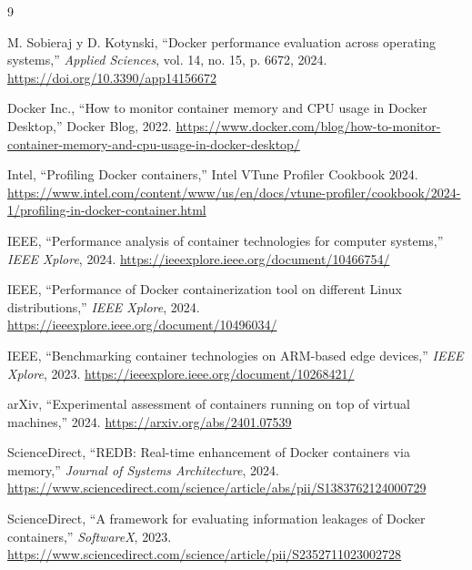 \documentclass[conference]{IEEEtran}
\begin{document}
\begin{thebibliography}{9}

M. Sobieraj y D. Kotynski,
``Docker performance evaluation across operating systems,''
\emph{Applied Sciences}, vol. 14, no. 15, p. 6672, 2024.
\url{https://doi.org/10.3390/app14156672}

Docker Inc.,
``How to monitor container memory and CPU usage in Docker Desktop,''
Docker Blog, 2022.
\url{https://www.docker.com/blog/how-to-monitor-container-memory-and-cpu-usage-in-docker-desktop/}

Intel,
``Profiling Docker containers,''
Intel VTune Profiler Cookbook 2024.
\url{https://www.intel.com/content/www/us/en/docs/vtune-profiler/cookbook/2024-1/profiling-in-docker-container.html}

IEEE,
``Performance analysis of container technologies for computer systems,''
\emph{IEEE Xplore}, 2024.
\url{https://ieeexplore.ieee.org/document/10466754/}

IEEE,
``Performance of Docker containerization tool on different Linux distributions,''
\emph{IEEE Xplore}, 2024.
\url{https://ieeexplore.ieee.org/document/10496034/}

IEEE,
``Benchmarking container technologies on ARM-based edge devices,''
\emph{IEEE Xplore}, 2023.
\url{https://ieeexplore.ieee.org/document/10268421/}

arXiv,
``Experimental assessment of containers running on top of virtual machines,''
2024.
\url{https://arxiv.org/abs/2401.07539}

ScienceDirect,
``REDB: Real-time enhancement of Docker containers via memory,''
\emph{Journal of Systems Architecture}, 2024.
\url{https://www.sciencedirect.com/science/article/abs/pii/S1383762124000729}

ScienceDirect,
``A framework for evaluating information leakages of Docker containers,''
\emph{SoftwareX}, 2023.
\url{https://www.sciencedirect.com/science/article/pii/S2352711023002728}

\end{thebibliography}
\end{document}
